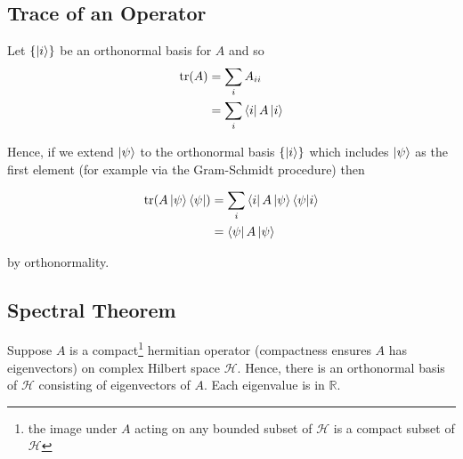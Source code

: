 \documentclass[11pt]{article}
\newcommand\0{\mathbf{0}}
\newcommand\RR{\mathbb{R}}
\newcommand\<{\langle}
\renewcommand\>{\rangle}
\begin{document}
\subsection{Trace of an Operator}\label{trop}

Let $\{\ket{i}\}$ be an orthonormal basis for $A$ and so
\begin{align*}
\tr(A) &= \sum_i A_{ii} \\
&= \sum_i \bra{i} A \ket{i}	
\end{align*}

Hence, if we extend $\ket{\psi}$ to the orthonormal basis $\{\ket{i}\}$ which includes $\ket{\psi}$ as the first element (for example via the Gram-Schmidt procedure) then

\begin{align*}
	\tr(A\ket{\psi}\bra{\psi}) &= \sum_i \bra{i} A\ket{\psi}\bra{\psi}\ket{i}	 \\
	&= \bra{\psi} A\ket{\psi}
\end{align*}

by orthonormality.

\subsection{Spectral Theorem}
Suppose $A$ is a compact\footnote{the image under $A$ acting on any bounded subset of $\mathcal{H}$ is a compact subset of $\mathcal{H}$} hermitian operator (compactness ensures $A$ has eigenvectors) on complex Hilbert space $\mathcal{H}$. Hence, there is an orthonormal basis of $\mathcal{H}$ consisting of eigenvectors of $A$. Each eigenvalue is in $\RR$.

\nocite{*}


\end{document}
